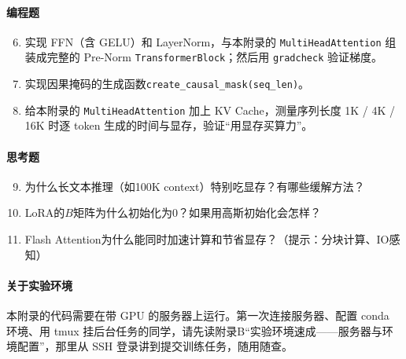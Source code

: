 \paragraph{编程题}

\begin{enumerate}
    \setcounter{enumi}{5}
    
    \item 实现 FFN（含 GELU）和 LayerNorm，与本附录的 \texttt{MultiHeadAttention} 组装成完整的 Pre-Norm \texttt{TransformerBlock}；然后用 \texttt{gradcheck} 验证梯度。
    
    \item 实现因果掩码的生成函数\texttt{create\_causal\_mask(seq\_len)}。
    
    \item 给本附录的 \texttt{MultiHeadAttention} 加上 KV Cache，测量序列长度 1K / 4K / 16K 时逐 token 生成的时间与显存，验证“用显存买算力”。
\end{enumerate}

\paragraph{思考题}

\begin{enumerate}
    \setcounter{enumi}{8}
    
    \item 为什么长文本推理（如100K context）特别吃显存？有哪些缓解方法？
    
    \item LoRA的$B$矩阵为什么初始化为0？如果用高斯初始化会怎样？
    
    \item Flash Attention为什么能同时加速计算和节省显存？（提示：分块计算、IO感知）
\end{enumerate}


\paragraph{关于实验环境}
本附录的代码需要在带 GPU 的服务器上运行。第一次连接服务器、配置 conda 环境、用 tmux 挂后台任务的同学，请先读附录B“实验环境速成——服务器与环境配置”，那里从 SSH 登录讲到提交训练任务，随用随查。


